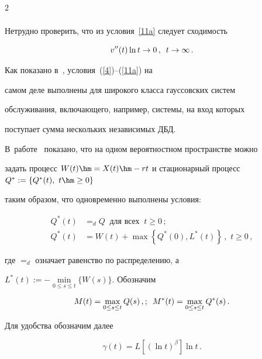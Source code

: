 \begin{multicols}{2}
\begin{align}
\end{align}


Нетрудно проверить, что из условия~\eqref{11a} следует сходимость


\begin{equation}


v''(t)\ln t \to 0\,,\enskip t \to \infty\,.\label{2.2.l20}


\end{equation}


Как показано в~\cite{Lukashenko},  условия~(\ref{4})--(\ref{11a}) на


самом деле выполнены для широкого класса гауссовских сис\-тем


обслуживания, включающего, например, сис\-те\-мы, на вход которых


поступает сумма нескольких независимых ДБД.


 В~работе~\cite{Konstantopoulos} показано, что на одном вероятностном пространстве можно


 задать процесс $W(t)\hm=X(t)\hm-rt$ и стационарный процесс $Q^*:=\{Q^*(t),\ t \hm\geq 0\}$


таким образом, что одновременно выполнены условия:


\begin{align*}


Q^*(t)&=_d Q \ \mbox{ для всех } \ t \geq 0\,; %


\\


Q^*(t)&=W(t)+\max\left\{Q^*(0), L^*(t)\right\}\,,\,\,t \geq 0\,, %


\end{align*}


где $=_d$ означает равенство по распределению, а


$L^*(t):=-\min\limits_{0\le s\le t}\{W(s)\}$. Обозначим


\begin{equation*}


M(t)=\max\limits_{0 \leq s \leq t}Q(s)\,,;\enskip M^*(t)=\max_{0 \leq s \leq


t}Q^*(s)\,.




\end{equation*}


Для удобства обозначим далее


\begin{equation*}


\gamma(t)=L\left[\left(\ln t \right)^\beta\right]  \ln t \,.



\end{equation*}
\end{multicols}
